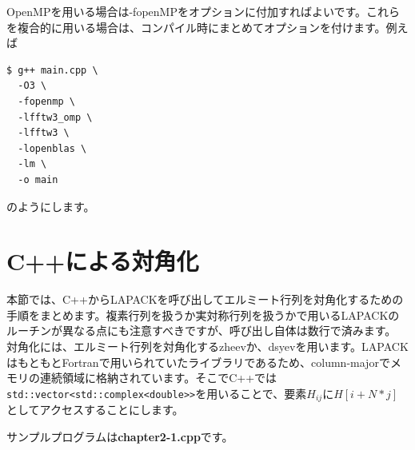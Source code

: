 \documentclass[12pt]{jreport}
\begin{document}
OpenMPを用いる場合は-fopenMPをオプションに付加すればよいです。これらを複合的に用いる場合は、コンパイル時にまとめてオプションを付けます。例えば

\begin{lstlisting}[style=terminal]
  $ g++ main.cpp \
  -O3 \
  -fopenmp \
  -lfftw3_omp \
  -lfftw3 \
  -lopenblas \
  -lm \
  -o main
\end{lstlisting}
のようにします。

\section{C++による対角化}
本節では、C++からLAPACKを呼び出してエルミート行列を対角化するための手順をまとめます。複素行列を扱うか実対称行列を扱うかで用いるLAPACKのルーチンが異なる点にも注意すべきですが、呼び出し自体は数行で済みます。
対角化には、エルミート行列を対角化するzheevか、dsyevを用います。LAPACKはもともとFortranで用いられていたライブラリであるため、column-majorでメモリの連続領域に格納されています。そこでC++では\texttt{std::vector<std::complex<double>>}を用いることで、要素$H_{ij}$に$H[i + N*j]$としてアクセスすることにします。

サンプルプログラムは\textbf{chapter2-1.cpp}です。
\end{document}
